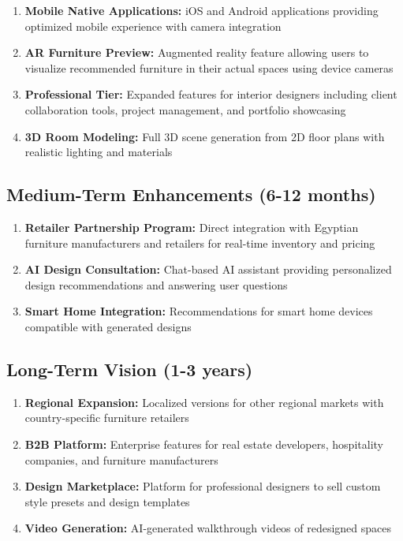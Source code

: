 \begin{enumerate}
    \item \textbf{Mobile Native Applications:} iOS and Android applications providing optimized mobile experience with camera integration
    
    \item \textbf{AR Furniture Preview:} Augmented reality feature allowing users to visualize recommended furniture in their actual spaces using device cameras
    
    \item \textbf{Professional Tier:} Expanded features for interior designers including client collaboration tools, project management, and portfolio showcasing
    
    \item \textbf{3D Room Modeling:} Full 3D scene generation from 2D floor plans with realistic lighting and materials
\end{enumerate}

\subsection{Medium-Term Enhancements (6-12 months)}

\begin{enumerate}
    \item \textbf{Retailer Partnership Program:} Direct integration with Egyptian furniture manufacturers and retailers for real-time inventory and pricing
    
    \item \textbf{AI Design Consultation:} Chat-based AI assistant providing personalized design recommendations and answering user questions
    
    \item \textbf{Smart Home Integration:} Recommendations for smart home devices compatible with generated designs
\end{enumerate}

\subsection{Long-Term Vision (1-3 years)}

\begin{enumerate}
    \item \textbf{Regional Expansion:} Localized versions for other regional markets with country-specific furniture retailers
    
    \item \textbf{B2B Platform:} Enterprise features for real estate developers, hospitality companies, and furniture manufacturers
    
    \item \textbf{Design Marketplace:} Platform for professional designers to sell custom style presets and design templates
    
    \item \textbf{Video Generation:} AI-generated walkthrough videos of redesigned spaces
\end{enumerate}

